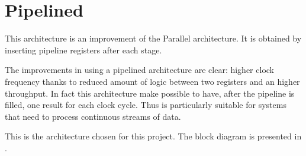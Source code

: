 \section{Pipelined}\label{sec:pipelined}

This architecture is an improvement of the Parallel architecture. It is obtained
by inserting pipeline registers after each stage.

The improvements in using a pipelined architecture are clear: higher clock
frequency thanks to reduced amount of logic between two registers and an higher
throughput. In fact this architecture make possible to have, after the pipeline
is filled, one result for each clock cycle. Thus is particularly suitable
for systems that need to process continuous streams of data.

This is the architecture chosen for this project. The block diagram is presented
in .
